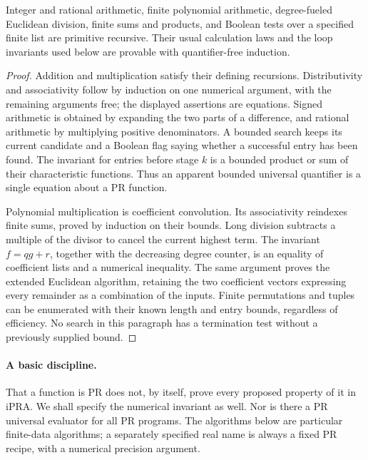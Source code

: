 \begin{lemma}\label{found:finite}
Integer and rational arithmetic, finite polynomial arithmetic, degree-fueled
Euclidean division, finite sums and products, and Boolean tests over a
specified finite list are primitive recursive. Their usual calculation
laws and the loop invariants used below are provable with quantifier-free
induction.
\end{lemma}
\begin{proof}
Addition and multiplication satisfy their defining recursions. Distributivity
and associativity follow by induction on one numerical argument, with the
remaining arguments free; the displayed assertions are equations. Signed
arithmetic is obtained by expanding the two parts of a difference, and
rational arithmetic by multiplying positive denominators. A bounded search
keeps its current candidate and a Boolean flag saying whether a successful
entry has been found. The invariant for entries before stage $k$ is a
bounded product or sum of their characteristic functions. Thus an apparent
bounded universal quantifier is a single equation about a PR function.

Polynomial multiplication is coefficient convolution. Its associativity
reindexes finite sums, proved by induction on their bounds. Long division
subtracts a multiple of the divisor to cancel the current highest term.
The invariant $f=qg+r$, together with the decreasing degree counter, is an
equality of coefficient lists and a numerical inequality. The same argument
proves the extended Euclidean algorithm, retaining the two coefficient
vectors expressing every remainder as a combination of the inputs.
Finite permutations and tuples can be enumerated with their known length
and entry bounds, regardless of efficiency. No search in this paragraph
has a termination test without a previously supplied bound.
\end{proof}

\paragraph{A basic discipline.}
That a function is PR does not, by itself, prove every proposed property
of it in iPRA. We shall specify the numerical invariant as well. Nor is
there a PR universal evaluator for all PR programs. The algorithms below
are particular finite-data algorithms; a separately specified real name is
always a fixed PR recipe, with a numerical precision argument.

